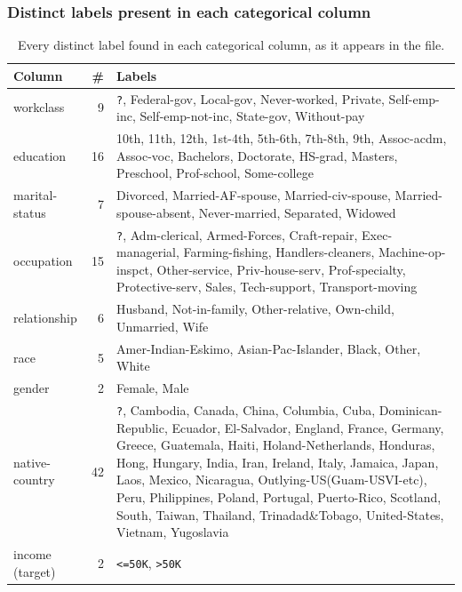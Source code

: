 \documentclass[11pt,a4paper]{article}
\newcommand{\code}[1]{\texttt{\small #1}}
\begin{document}
\subsubsection*{Distinct labels present in each categorical column}

\begin{table}[H]
\centering
\caption{Every distinct label found in each categorical column, as it appears in the file.}
\small
\begin{adjustbox}{max width=\linewidth}
\begin{tabular}{L{2.6cm}rL{11.2cm}}
\toprule
\textbf{Column} & \textbf{\#} & \textbf{Labels} \\
\midrule
workclass & 9 &
\code{?}, Federal-gov, Local-gov, Never-worked, Private, Self-emp-inc, Self-emp-not-inc,
State-gov, Without-pay \\
education & 16 &
10th, 11th, 12th, 1st-4th, 5th-6th, 7th-8th, 9th, Assoc-acdm, Assoc-voc, Bachelors,
Doctorate, HS-grad, Masters, Preschool, Prof-school, Some-college \\
marital-status & 7 &
Divorced, Married-AF-spouse, Married-civ-spouse, Married-spouse-absent, Never-married,
Separated, Widowed \\
occupation & 15 &
\code{?}, Adm-clerical, Armed-Forces, Craft-repair, Exec-managerial, Farming-fishing,
Handlers-cleaners, Machine-op-inspct, Other-service, Priv-house-serv, Prof-specialty,
Protective-serv, Sales, Tech-support, Transport-moving \\
relationship & 6 &
Husband, Not-in-family, Other-relative, Own-child, Unmarried, Wife \\
race & 5 &
Amer-Indian-Eskimo, Asian-Pac-Islander, Black, Other, White \\
gender & 2 & Female, Male \\
native-country & 42 &
\code{?}, Cambodia, Canada, China, Columbia, Cuba, Dominican-Republic, Ecuador,
El-Salvador, England, France, Germany, Greece, Guatemala, Haiti,
Holand-Netherlands, Honduras, Hong, Hungary, India, Iran, Ireland, Italy, Jamaica,
Japan, Laos, Mexico, Nicaragua, Outlying-US(Guam-USVI-etc), Peru, Philippines, Poland,
Portugal, Puerto-Rico, Scotland, South, Taiwan, Thailand, Trinadad\&Tobago,
United-States, Vietnam, Yugoslavia \\
income (target) & 2 & \code{<=50K}, \code{>50K} \\
\bottomrule
\end{tabular}
\end{adjustbox}
\end{table}
\end{document}
